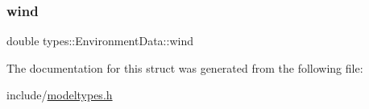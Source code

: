 \mbox{\label{structtypes_1_1_environment_data_a72e7a0344d8933bb87e09f774a49d48c}} 
\subsubsection{\texorpdfstring{wind}{wind}}
{\footnotesize\ttfamily double types\+::\+Environment\+Data\+::wind}



The documentation for this struct was generated from the following file\+:\begin{DoxyCompactItemize}
\item 
include/\mbox{\hyperlink{modeltypes_8h}{modeltypes.\+h}}\end{DoxyCompactItemize}
